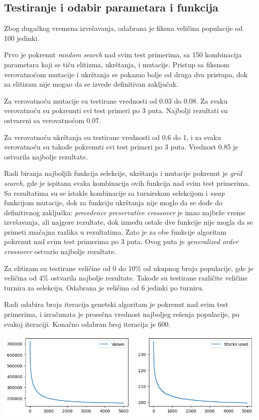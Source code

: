 \documentclass[12pt, a4paper]{article}
\begin{document}
\subsection{Testiranje i odabir parametara i funkcija}
Zbog dugačkog vremena izvršavanja, odabrana je fiksna veličina populacije od 100 jedinki. 

Prvo je pokrenut \textit{random search} nad svim test primerima, sa 150 kombinacija parametara koji se tiču elitizma, ukrštanja, i mutacije. Pristup sa fiksnom verovatnoćom mutacije i ukrštanja se pokazao bolje od druga dva pristupa, dok za elitizam nije mogao da se izvede definitivan zaključak.

Za verovatnoću mutacije su testirane vrednosti od 0.03 do 0.08. Za svaku verovatnoću su pokrenuti svi test primeri po 3 puta. Najbolji rezultati su ostvareni sa verovatnoćom 0.07.

Za verovatnoću ukrštanja su testirane vrednosti od 0.6 do 1, i za svaku verovatnoću su takođe pokrenuti svi test primeri po 3 puta. Vrednost 0.85 je ostvarila najbolje rezultate.

Radi biranja najboljih funkcija selekcije, ukrštanja i mutacije pokrenut je \textit{grid search}, gde je ispitana svaka kombinacija ovih funkcija nad svim test primerima. Sa rezultatima su se istakle kombinacije sa turnirskom selekcijom i \textit{swap} funkcijom mutacije, dok za funkciju ukrštanja nije moglo da se dođe do definitivnog zaključka: \textit{precedence preservative crossover} je imao najbrže vreme izvršavanja, ali najgore rezultate, dok između ostale dve funkcije nije mogla da se primeti značajna razlika u rezultatima. Zato je za obe funkcije algoritam pokrenut nad svim test primerima po 3 puta. Ovog puta je \textit{generalized order crossover} ostvario najbolje rezultate. 

Za elitizam su testirane veličine od 0 do 10\% od ukupnog broja populacije, gde je veličina od 4\% ostvarila najbolje rezultate. Takođe su testirane različite veličine turnira za selekciju. Odabrana je veličina od 6 jedinki po turniru.

Radi odabira broja iteracija genetski algoritam je pokrenut nad svim test primerima, i izračunata je prosečna vrednost najboljeg rešenja populacije, po svakoj iteraciji. Konačno odabran broj iteracija je 600.

\vspace{0.5cm}
\begin{center}
  \hspace{1cm}
  \includegraphics[width=\linewidth]{img/ga_iters.png}
  \hspace{1cm} 
\end{center}
\vspace{0.5cm}
\end{document}
